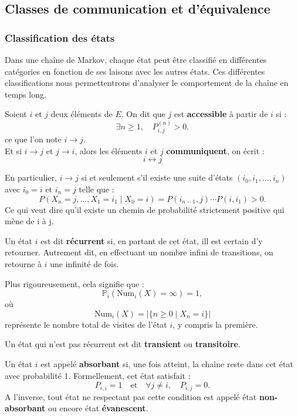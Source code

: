 \documentclass{article}
\begin{document}
\subsection{Classes de communication et d'équivalence}

\subsubsection{Classification des états}
\label{subsubsec: Les différents types d'états}

Dans une chaîne de Markov, chaque état peut être classifié en différentes catégories en fonction de ses laisons avec les autres états. Ces différentes classifications nous permettentrons d'analyser le comportement de la chaîne en temps long.

\begin{tcolorbox}[colback=white,colframe=blue!80!black,title=Accessibilité]
Soient $i$ et $j$ deux éléments de $E$. On dit que $j$ est \textbf{accessible} à partir de $i$ si :
\[
\exists n \geq 1, \quad P_{i,j}^{(n)} > 0.
\]
ce que l'on note $i \to j$. \\
Et si $i \to j$ et $j \to i$, alors les éléments $i$ et $j$ \textbf{communiquent}, on écrit :
\[
i \leftrightarrow j
\]
\end{tcolorbox}

En particulier, $i \to j$ si et seulement s'il existe une suite d'états $(i_0, i_1, \dots, i_n)$ avec $i_0 = i$ et $i_n = j$ telle que :
\[
P(X_n = j, \dots, X_1 = i_1 \mid X_0 = i) = P(i_{n-1}, j) \cdots P(i, i_1) > 0.
\]
Ce qui veut dire qu'il existe un chemin de probabilité strictement positive
qui mène de i à j.

\begin{tcolorbox}[colback=white,colframe=blue!80!black,title=État récurrent]
Un état $i$ est dit \textbf{récurrent} si, en partant de cet état, ill est certain d'y retourner.  
Autrement dit, en effectuant un nombre infini de transitions, on retourne à $i$ une infinité de fois.  

Plus rigoureusement, cela signifie que :  
\[
\mathbb{P}_i(\text{Num}_i(X) = \infty) = 1,
\]
où  
\[
\text{Num}_i(X) = |\{n \geq 0 \mid X_n = i\}|
\]
représente le nombre total de visites de l'état $i$, y compris la première.  

Un état qui n'est pas récurrent est dit \textbf{transient} ou \textbf{transitoire}.  
\end{tcolorbox}

\begin{tcolorbox}[colback=white,colframe=blue!80!black,title=État absorbant]
Un état $i$ est appelé \textbf{absorbant} si, une fois atteint, la chaîne reste dans cet état avec probabilité 1. Formellement, cet état satisfait :
\[
P_{i,i} = 1 \quad \text{et} \quad \forall j \neq i, \quad P_{i,j} = 0.
\]
A l'inverse, tout état ne respectant pas cette condition est appelé état \textbf{non-absorbant} ou encore état \textbf{évanescent}. \\
\end{tcolorbox}
\end{document}
